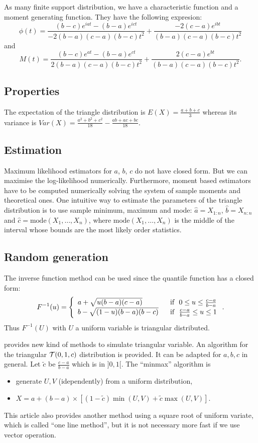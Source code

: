 As many finite support distribution, we have a characteristic function and a moment generating function. They have the following expresion:
$$
\phi(t) = \frac{(b-c)e^{iat}-(b-a)e^{ict}}{-2(b-a)(c-a)(b-c)t^2}+\frac{-2(c-a)e^{ibt}}{(b-a)(c-a)(b-c)t^2} 
$$
and
$$
M(t) = \frac{(b-c)e^{at}-(b-a)e^{ct}}{2(b-a)(c-a)(b-c)t^2}+\frac{2(c-a)e^{bt}}{(b-a)(c-a)(b-c)t^2}.
$$



\subsection{Properties}
The expectation of the triangle distribution is $E(X) = \frac{a+b+c}{3}$ whereas its variance is $Var(X) = \frac{a^2+b^2+c^2}{18}-\frac{ab+ac+bc}{18}$.

\subsection{Estimation}
Maximum likelihood estimators for $a$, $b$, $c$ do not have closed form. But we can maximise the log-likelihood numerically. Furthermore, moment based estimators have to be computed numerically solving the system of sample moments and theoretical ones. One intuitive way to estimate the parameters of the triangle distribution is to use sample minimum, maximum and mode:
$\hat a = X_{1:n}$, $\hat b=X_{n:n}$ and $\hat c = \textrm{mode}(X_1,\dots,X_n)$, where $\textrm{mode}(X_1,\dots,X_n)$ is the middle of the interval whose bounds are the most likely order statistics.

\subsection{Random generation}
The inverse function method can be used since the quantile function has a closed form:
$$
F^{-1}(u) = \left\{
\begin{array}{ll}
a+\sqrt{u(b-a)(c-a)} & \textrm{~~if~~} 0\leq u\leq \frac{c-a}{b-a}\\
b-\sqrt{(1-u)(b-a)(b-c)} & \textrm{~~if~~} \frac{c-a}{b-a} \leq u \leq1\\
\end{array}
\right. .
$$
Thus $F^{-1}(U)$ with $U$ a uniform variable is triangular distributed.

\cite{steinkeblis} provides new kind of methods to simulate triangular variable. An algorithm for the triangular $\mathcal T(0,1,c)$ distribution is provided. It can be adapted for $a,b,c$ in general. 
Let $\tilde c$ be $\frac{c-a}{b-a}$ which is in $]0,1[$. The ``minmax'' algorithm is
\begin{itemize}
\item generate $U,V$ (idependently) from a uniform distribution,
\item $X =  a+(b-a)\times\left[(1-\tilde c) \min(U,V) + \tilde c \max(U,V)\right]$.
\end{itemize}
This article also provides another method using a square root of uniform variate, which is called ``one line method'', but it is not necessary more fast if we use vector operation.

